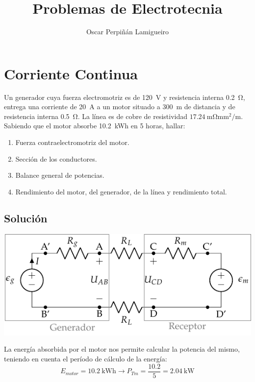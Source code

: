 \documentclass[10pt]{article}
\begin{document}
\title{Problemas de Electrotecnia}

\date{}

\author{Oscar Perpiñán Lamigueiro}

\maketitle

\section*{Corriente Continua}

Un generador cuya fuerza electromotriz es de \SI{120}{V} y resistencia interna \SI{0.2}{\ohm}, entrega una corriente de \SI{20}{\ampere} a un motor situado a \SI{300}{\meter} de distancia y de resistencia interna \SI{0.5}{\ohm}. La línea es de cobre de resistividad $\SI{17.24}{\milli\ohm\milli\meter\squared\per\meter}$. Sabiendo que el motor absorbe \SI{10.2}{\kWh} en 5 horas, hallar: 
\begin{enumerate}
\item Fuerza contraelectromotriz del motor.
\item Sección de los conductores.
\item Balance general de potencias.
\item Rendimiento del motor, del generador, de la línea y rendimiento total.
\end{enumerate}

\subsection*{Solución}

\begin{center}
  \includegraphics{../diapos/figs/circuito_lkv}
\end{center}

La energía absorbida por el motor nos permite calcular la potencia del mismo, teniendo en cuenta el período de cálculo de la energía:
\[
  E_{motor} = \SI{10.2}{\kWh} \rightarrow P_{Tm} = \frac{10.2}{5} = \SI{2.04}{\kilo\watt}
\]
\end{document}
